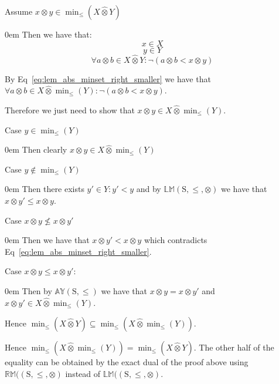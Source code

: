 \documentclass[10pt]{article}
\newcommand{\propname}[1]{{\mathbb{#1}}}
\newcommand{\lift}{\hat{\otimes}}
\newenvironment{ind}[0]{\begin{addmargin}[1em]{0em}\vspace{0.5em}}{\end{addmargin}\vspace{0.5em}}
\begin{document}
\vspace{2em}

Assume $x \otimes y \in \min_\leq(X \lift Y)$
\begin{ind}
Then we have that:
\begin{equation}
x \in X
\end{equation}
\begin{equation}
y \in Y
\end{equation}
\begin{equation} \label{eq:lem_abs_minset_right_smaller}
\forall a \otimes b \in X \lift Y : \neg (a \otimes b < x \otimes y)
\end{equation}

By Eq~\ref{eq:lem_abs_minset_right_smaller} we have that $\forall a \otimes b \in X \lift \min_\leq(Y) : \neg (a \otimes b < x \otimes y)$.

\vspace{0.5em}

Therefore we just need to show that $x \otimes y \in X \lift \min_\leq(Y)$.

\vspace{0.5em}

Case $y \in \min_\leq(Y)$
\begin{ind}
Then clearly $x \otimes y \in X \lift \min_\leq(Y)$
\end{ind}

Case $y \notin \min_\leq(Y)$
\begin{ind}
Then there exists $y' \in Y : y' < y$ and by $\propname{LM}\mathrm{(S,\leq,\otimes)}$ we have that $x \otimes y' \leq x \otimes y$.

\vspace{0.5em}

Case $x \otimes y \nleq x \otimes y'$
\begin{ind}
Then we have that $x \otimes y' < x \otimes y$ which contradicts Eq~\ref{eq:lem_abs_minset_right_smaller}.
\end{ind}
Case $x \otimes y \leq x \otimes y'$:
\begin{ind}
Then by $\propname{AY}\mathrm{(S,\leq)}$ we have that $x \otimes y = x \otimes y'$ and $x \otimes y' \in X \lift \min_\leq(Y)$.
\end{ind}
\end{ind}
\end{ind}
Hence $\min_\leq(X \lift Y) \subseteq \min_\leq(X \lift \min_\leq(Y))$.

\vspace{2em}

Hence $\min_\leq(X \lift \min_\leq(Y)) = \min_\leq(X \lift Y)$. The other half of the equality can be obtained by the exact dual of the proof above using $\propname{RM}(\mathrm{(S,\leq,\otimes)}$ instead of $\propname{LM}(\mathrm{(S,\leq,\otimes)}$.
\end{document}
